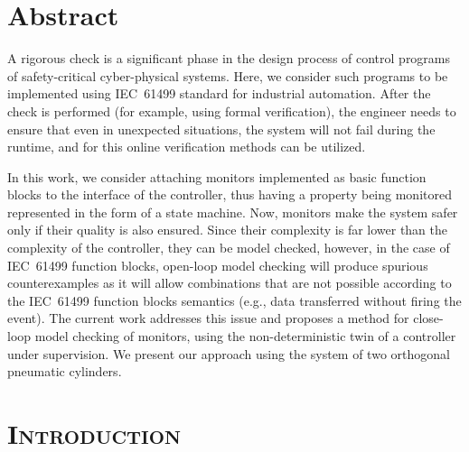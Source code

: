 \begin{bibunit}
\thispagestyle{plain}

\section*{Abstract}
A rigorous check is a significant phase in the design process of control programs of safety-critical cyber-physical systems. Here, we consider such programs to be implemented using IEC~61499 standard for industrial automation. After the check is performed (for example, using formal verification), the engineer needs to ensure that even in unexpected situations, the system will not fail during the runtime, and for this online verification methods can be utilized.

In this work, we consider attaching monitors implemented as basic function blocks to the interface of the controller, thus having a property being monitored represented in the form of a state machine. Now, monitors make the system safer only if their quality is also ensured. Since their complexity is far lower than the complexity of the controller, they can be model checked, however, in the case of IEC~61499 function blocks, open-loop model checking will produce spurious counterexamples as it will allow combinations that are not possible according to the IEC~61499 function blocks semantics (e.g., data transferred without firing the event). The current work addresses this issue and proposes a method for close-loop model checking of monitors, using the non-deterministic twin of a controller under supervision. We present our approach using the system of two orthogonal pneumatic cylinders.

\section{\textsc{Introduction}}





\end{bibunit}
